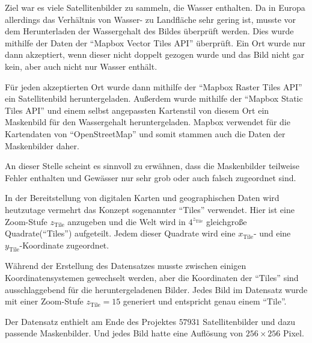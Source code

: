 Ziel war es viele Satellitenbilder zu sammeln, die Wasser enthalten.
Da in Europa allerdings das Verhältnis von Wasser- zu Landfläche sehr gering ist, musste vor dem Herunterladen der Wassergehalt des Bildes überprüft werden.
Dies wurde mithilfe der Daten der \enquote{Mapbox Vector Tiles API} überprüft. \cite{mapbox_vector_tiles}
Ein Ort wurde nur dann akzeptiert, wenn dieser nicht doppelt gezogen wurde und das Bild nicht gar kein, aber auch nicht nur Wasser enthält.

Für jeden akzeptierten Ort wurde dann mithilfe der \enquote{Mapbox Raster Tiles API} ein Satellitenbild heruntergeladen.\cite{mapbox_raster_tiles}
Außerdem wurde mithilfe der \enquote{Mapbox Static Tiles API} und einem selbst angepassten Kartenstil von diesem Ort ein Maskenbild für den Wassergehalt heruntergeladen.\cite{mapbox_static_tiles}
Mapbox verwendet für die Kartendaten von \enquote{OpenStreetMap} und somit stammen auch die Daten der Maskenbilder daher.\cite{OpenStreetMap}

An dieser Stelle scheint es sinnvoll zu erwähnen, dass die Maskenbilder teilweise Fehler enthalten und Gewässer nur sehr grob oder auch falsch zugeordnet sind. 

In der Bereitstellung von digitalen Karten und geographischen Daten wird heutzutage vermehrt das Konzept sogenannter \enquote{Tiles} verwendet.\cite{tiles}
Hier ist eine Zoom-Stufe $z_\text{Tile}$ anzugeben und die Welt wird in $4^{z_\text{Tile}}$ gleichgroße Quadrate(\enquote{Tiles}) aufgeteilt.
Jedem dieser Quadrate wird eine $x_\text{Tile}$- und eine $y_\text{Tile}$-Koordinate zugeordnet.

Während der Erstellung des Datensatzes musste zwischen einigen Koordinatensystemen gewechselt werden, aber die Koordinaten der \enquote{Tiles} sind ausschlaggebend für die heruntergeladenen Bilder.
Jedes Bild im Datensatz wurde mit einer Zoom-Stufe $z_\text{Tile} = 15$ generiert und entspricht genau einem \enquote{Tile}.

Der Datensatz enthielt am Ende des Projektes $57931$ Satellitenbilder und dazu passende Maskenbilder.
Und jedes Bild hatte eine Auflösung von $256 \times 256$ Pixel.

